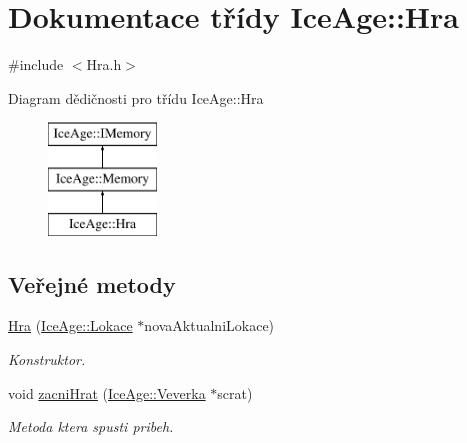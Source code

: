 \hypertarget{classIceAge_1_1Hra}{}\section{Dokumentace třídy Ice\+Age\+:\+:Hra}
\label{classIceAge_1_1Hra}


{\ttfamily \#include $<$Hra.\+h$>$}

Diagram dědičnosti pro třídu Ice\+Age\+:\+:Hra\begin{figure}[H]
\begin{center}
\leavevmode
\includegraphics[height=3.000000cm]{d3/dc5/classIceAge_1_1Hra}
\end{center}
\end{figure}
\subsection*{Veřejné metody}
\begin{DoxyCompactItemize}
\item 
\hyperlink{classIceAge_1_1Hra_ae4538962681c44e099fac261639e4063}{Hra} (\hyperlink{classIceAge_1_1Lokace}{Ice\+Age\+::\+Lokace} $\ast$nova\+Aktualni\+Lokace)
\begin{DoxyCompactList}\small\item\em Konstruktor. \end{DoxyCompactList}\item 
void \hyperlink{classIceAge_1_1Hra_a60ee65556b0198201f3e5fd8d2cd97e0}{zacni\+Hrat} (\hyperlink{classIceAge_1_1Veverka}{Ice\+Age\+::\+Veverka} $\ast$scrat)
\begin{DoxyCompactList}\small\item\em Metoda ktera spusti pribeh. \end{DoxyCompactList}\end{DoxyCompactItemize}
